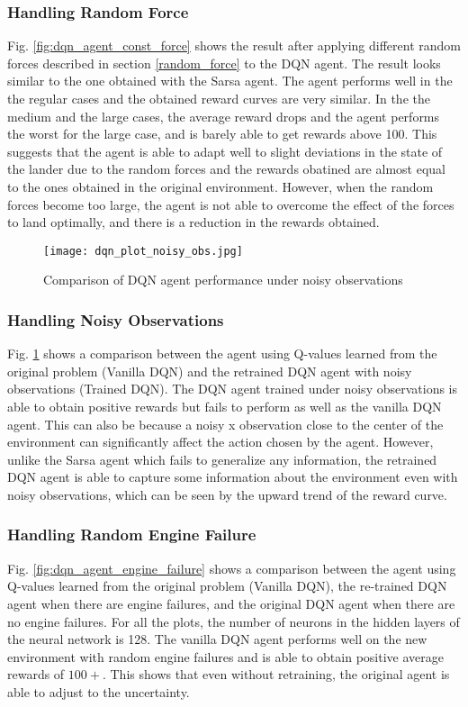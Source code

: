 \documentclass[10pt, conference]{IEEEtran}
\begin{document}
\subsubsection{Handling Random Force}
Fig. \ref{fig:dqn_agent_const_force} shows the result after applying different random forces described in section \ref{random_force} to the DQN agent. The result looks similar to the one obtained with the Sarsa agent. The agent performs well in the the regular cases and the obtained reward curves are very similar. In the the medium and the large cases, the average reward drops and the agent performs the worst for the large case, and is barely able to get rewards above 100. This suggests that the agent is able to adapt well to slight deviations in the state of the lander due to the random forces and the rewards obatined are almost equal to the ones obtained in the original environment. However, when the random forces become too large, the agent is not able to overcome the effect of the forces to land optimally, and there is a reduction in the rewards obtained. 


\begin{figure}[!t]
    \centering
    \texttt{[image: dqn\_plot\_noisy\_obs.jpg]}
    \caption{Comparison of DQN agent performance under noisy observations}
    \label{fig:dqn_agent_noisy_obs}
\end{figure}

\subsubsection{Handling Noisy Observations}
Fig. \ref{fig:dqn_agent_noisy_obs} shows a comparison between the agent using Q-values learned from the original problem (Vanilla DQN) and the retrained DQN agent with noisy observations (Trained DQN). The DQN agent trained under noisy observations is able to obtain positive rewards but fails to perform as well as the vanilla DQN agent. This can also be because a noisy x observation close to the center of the environment can significantly affect the action chosen by the agent. However, unlike the Sarsa agent which fails to generalize any information, the retrained DQN agent is able to capture some information about the environment even with noisy observations, which can be seen by the upward trend of the reward curve. 

\subsubsection{Handling Random Engine Failure}
Fig. \ref{fig:dqn_agent_engine_failure} shows a comparison between the agent using Q-values learned from the original problem (Vanilla DQN), the re-trained DQN agent when there are engine failures, and the original DQN agent when there are no engine failures. For all the plots, the number of neurons in the hidden layers of the neural network is 128. The vanilla DQN agent performs well on the new environment with random engine failures and is able to obtain positive average rewards of $100+$. This shows that even without retraining, the original agent is able to adjust to the uncertainty.
\end{document}
